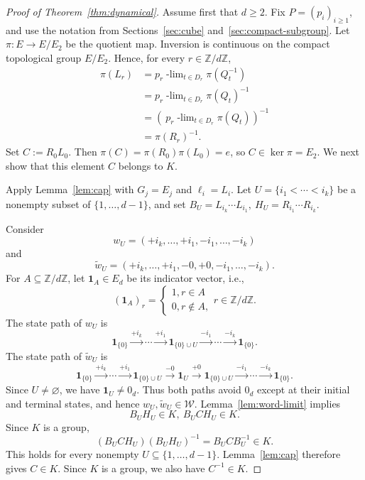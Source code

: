 \documentclass[10pt,a4paper]{amsart}
\newcommand{\Z}{\mathbb Z}
\newcommand{\cW}{\mathcal W}
\newcommand{\ulim}[2]{#1\!\operatorname{-lim}_{#2}}
\begin{document}
\begin{proof}[Proof of Theorem~\ref{thm:dynamical}]
Assume first that $d\geq2$.  Fix $P=(p_i)_{i\geq1}$, and use the
notation from Sections~\ref{sec:cube} and~\ref{sec:compact-subgroup}.
Let $\pi:E\longrightarrow E/E_2$ be the quotient map.  Inversion is continuous
on the compact topological
group $E/E_2$.  Hence, for every $r\in\Z/d\Z$,
\[
\begin{aligned}
 \pi(L_r)
 &=\ulim{  p_r}{t\in D_r}\pi(Q_t^{-1})\\
 &=\ulim{ p_r}{t\in D_r}\pi(Q_t)^{-1}\\
 &=\left(\ulim{\ p_r}{t\in D_r}\pi(Q_t)\right)^{-1}\\
 &=\pi(R_r)^{-1}.
\end{aligned}
\]
Set $C:=R_0L_0$.
Then $\pi(C)=\pi(R_0)\pi(L_0)=e$,
so $C\in\ker\pi=E_2$. We next show that this element $C$ belongs to $K$.
 

Apply Lemma~\ref{lem:cap} with $G_j=E_j$ and $\ell_i=L_i$.  Let
$U=\{i_1<\cdots<i_k\}$ be a nonempty subset of $\{1,\ldots,d-1\}$, and set $B_U=L_{i_k}\cdots L_{i_1},\ H_U=R_{i_1}\cdots R_{i_k}$.
 
 
Consider
\[
 w_U=(+i_k,\ldots,+i_1,-i_1,\ldots,-i_k)
\]
and
\[
 \widetilde w_U=(+i_k,\ldots,+i_1,-0,+0,-i_1,\ldots,-i_k).
\]
For $A\subseteq\Z/d\Z$, let $\mathbf1_A\in E_d$ be its indicator vector, i.e., 
\[
 (\mathbf1_A)_r= \begin{cases}
                  1, r\in A\\
                  0, r\notin A, 
                  \end{cases}   r\in \Z/d\Z.
\]
The state path of $w_U$ is
\[
 \mathbf1_{\{0\}}
 \xrightarrow{+i_k}\cdots\xrightarrow{+i_1}
 \mathbf1_{\{0\}\cup U}
 \xrightarrow{-i_1}\cdots\xrightarrow{-i_k}
 \mathbf1_{\{0\}}.
\]
The state path of $\widetilde w_U$ is
\[
 \mathbf1_{\{0\}}
 \xrightarrow{+i_k}\cdots\xrightarrow{+i_1}
 \mathbf1_{\{0\}\cup U} \xrightarrow{-0}
 \mathbf1_U\xrightarrow{+0}
 \mathbf1_{\{0\}\cup U} 
 \xrightarrow{-i_1}\cdots\xrightarrow{-i_k}
 \mathbf1_{\{0\}}.
\]
Since $U\neq\varnothing$, we have $\mathbf1_U\neq0_d$.  Thus both
paths avoid $0_d$ except at their initial and terminal states, and hence $w_U,\widetilde w_U\in\cW$.
Lemma~\ref{lem:word-limit} implies  
\[
 B_UH_U\in K, \ B_UCH_U\in K.
\]
Since $K$ is a group,
\[
 (B_UCH_U)(B_UH_U)^{-1}=B_UCB_U^{-1}\in K.
\]
This holds for every nonempty $U\subseteq\{1,\ldots,d-1\}$.  
Lemma~\ref{lem:cap} therefore gives $C\in K$.  Since $K$ is a group, we also have $C^{-1}\in K$.
 


\end{proof}
\end{document}
